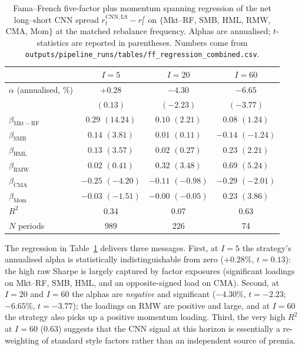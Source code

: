 \documentclass{article}
\begin{document}
\begin{table}[t]
  \centering
  \caption{Fama--French five-factor plus momentum spanning regression
    of the net long--short CNN spread $r_t^{\mathrm{CNN,LS}}-r_t^f$
    on $\{$Mkt--RF, SMB, HML, RMW, CMA, Mom$\}$ at the matched
    rebalance frequency. Alphas are annualised; $t$-statistics are
    reported in parentheses. Numbers come from
    \texttt{outputs/pipeline\_runs/tables/ff\_regression\_combined.csv}.}
  \label{tab:ff6}
  \small
  \begin{tabular}{lccc}
    \toprule
                          & $I=5$ & $I=20$ & $I=60$ \\
    \midrule
    $\alpha$ (annualised, \%) & $+0.28$  & $-4.30$ & $-6.65$ \\
                              & $(0.13)$ & $(-2.23)$ & $(-3.77)$ \\
    $\beta_{\mathrm{Mkt-RF}}$ & $0.29$ $(14.24)$ & $0.10$ $(2.21)$ & $0.08$ $(1.24)$ \\
    $\beta_{\mathrm{SMB}}$    & $0.14$ $(3.81)$  & $0.01$ $(0.11)$ & $-0.14$ $(-1.24)$ \\
    $\beta_{\mathrm{HML}}$    & $0.13$ $(3.57)$  & $0.02$ $(0.27)$ & $0.23$ $(2.21)$ \\
    $\beta_{\mathrm{RMW}}$    & $0.02$ $(0.41)$  & $0.32$ $(3.48)$ & $0.69$ $(5.24)$ \\
    $\beta_{\mathrm{CMA}}$    & $-0.25$ $(-4.20)$ & $-0.11$ $(-0.98)$ & $-0.29$ $(-2.01)$ \\
    $\beta_{\mathrm{Mom}}$    & $-0.03$ $(-1.51)$ & $-0.00$ $(-0.05)$ & $0.23$ $(3.86)$ \\
    $R^{2}$                   & 0.34 & 0.07 & 0.63 \\
    $N$ periods               & 989  & 226  & 74   \\
    \bottomrule
  \end{tabular}
\end{table}

The regression in Table~\ref{tab:ff6} delivers three messages. First, at
$I=5$ the strategy's annualised alpha is statistically indistinguishable
from zero ($+0.28\%$, $t=0.13$): the high raw Sharpe is largely captured
by factor exposures (significant loadings on Mkt--RF, SMB, HML, and an
opposite-signed load on CMA). Second, at $I=20$ and $I=60$ the alphas
are \emph{negative} and significant ($-4.30\%$, $t=-2.23$; $-6.65\%$,
$t=-3.77$); the loadings on RMW are positive and large, and at $I=60$ the
strategy also picks up a positive momentum loading. Third, the very
high $R^{2}$ at $I=60$ ($0.63$) suggests that the CNN signal at this
horizon is essentially a re-weighting of standard style factors rather
than an independent source of premia.
\end{document}

